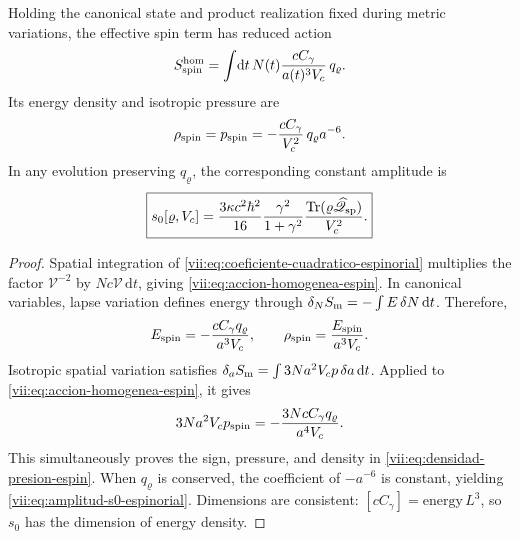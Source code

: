 \begin{theorem}
\label{vii:thm:amplitud-material-explicita}
Holding the canonical state and product realization fixed during
metric variations, the effective spin term has reduced action
\begin{equation}
 S_{\rm spin}^{\rm hom}
 =\int\!\mathrm dt\,N(t)
       \frac{cC_\gamma}{a(t)^3V_c}\,q_\varrho.
 \label{vii:eq:accion-homogenea-espin}
\end{equation}
Its energy density and isotropic pressure are
\begin{equation}
 \rho_{\rm spin}=p_{\rm spin}
 =-\frac{cC_\gamma}{V_c^2}\,q_\varrho a^{-6}.
 \label{vii:eq:densidad-presion-espin}
\end{equation}
In any evolution preserving \(q_\varrho\), the corresponding
constant amplitude is
\begin{equation}
 \boxed{\displaystyle
 s_0[\varrho,V_c]
 =\frac{3\kappa c^2\hbar^2}{16}
    \frac{\gamma^2}{1+\gamma^2}
    \frac{\operatorname{Tr}
       (\varrho\widehat{\mathscr Q}_{\rm sp})}{V_c^2}.}
 \label{vii:eq:amplitud-s0-espinorial}
\end{equation}
\end{theorem}
\begin{proof}
Spatial integration of
\eqref{vii:eq:coeficiente-cuadratico-espinorial} multiplies the
factor \(\mathcal V^{-2}\) by
\(Nc\mathcal V\,\mathrm dt\), giving
\eqref{vii:eq:accion-homogenea-espin}. In canonical variables,
lapse variation defines energy through
\(\delta_N S_{\rm m}=-\int E\,\delta N\,\mathrm dt\).
Therefore,
\[
 E_{\rm spin}=-\frac{cC_\gamma q_\varrho}{a^3V_c},
 \qquad \rho_{\rm spin}=\frac{E_{\rm spin}}{a^3V_c}.
\]
Isotropic spatial variation satisfies
\(\delta_a S_{\rm m}=\int3Na^2V_c p\,\delta a\,\mathrm dt\).
Applied to \eqref{vii:eq:accion-homogenea-espin}, it gives
\[
 3Na^2V_c p_{\rm spin}
 =-\frac{3NcC_\gamma q_\varrho}{a^4V_c}.
\]
This simultaneously proves the sign, pressure, and density in
\eqref{vii:eq:densidad-presion-espin}. When
\(q_\varrho\) is conserved, the coefficient of \(-a^{-6}\)
is constant, yielding \eqref{vii:eq:amplitud-s0-espinorial}.
Dimensions are consistent: \([cC_\gamma]=\mathrm{energy}\,L^3\),
so \(s_0\) has the dimension of energy density.
\end{proof}

